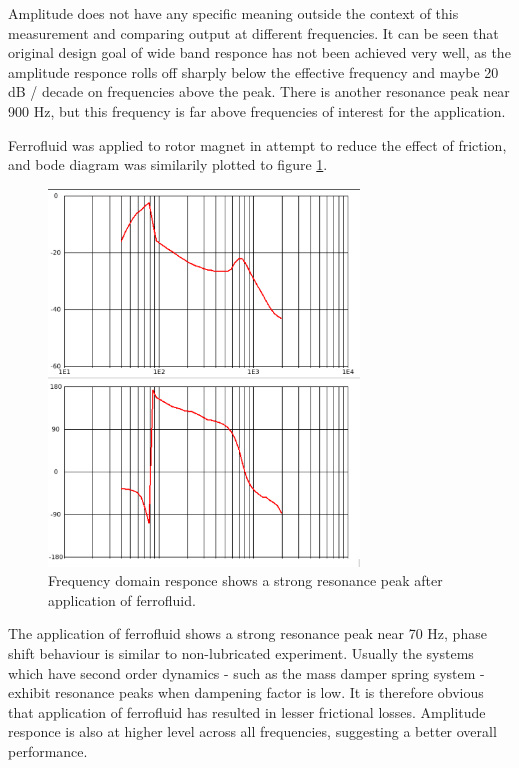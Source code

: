 Amplitude does not have any specific meaning outside the context of this measurement and comparing output at different frequencies. It can be seen that original design goal of wide band responce has not been achieved very well, as the amplitude responce rolls off sharply below the effective frequency and maybe 20 dB / decade on frequencies above the peak. There is another resonance peak near 900 Hz, but this frequency is far above frequencies of interest for the application. 

Ferrofluid was applied to rotor magnet in attempt to reduce the effect of friction, and bode diagram was similarily plotted to figure \ref{fig:inductive_bode_ferro}.

\begin{figure}[htb]
\begin{center}
\includegraphics[height=10cm]{images/own_measurement/generator_shaker/inductive_bode_ferro.png}
\end{center}
\caption{\label{fig:inductive_bode_ferro} Frequency domain responce shows a strong resonance peak after application of ferrofluid.}
\end{figure}

The application of ferrofluid shows a strong resonance peak near 70 Hz, phase shift behaviour is similar to non-lubricated experiment. Usually the systems which have second order dynamics - such as the mass damper spring system - exhibit resonance peaks when dampening factor is low. It is therefore obvious that application of ferrofluid has resulted in lesser frictional losses. Amplitude responce is also at higher level across all frequencies, suggesting a better overall performance. 

